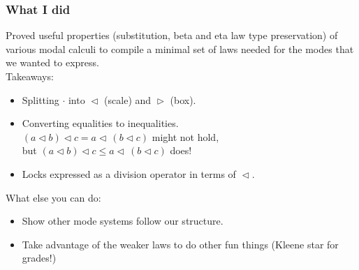 \documentclass[9pt]{beamer}
\DeclareMathOperator{\scale}{\mathbin{\triangleleft}}
\DeclareMathOperator{\boxop}{\mathbin{\triangleright}}
\begin{document}
\begin{frame}
\vspace{0.7em}
\frametitle{What I did}
Proved useful properties (substitution, beta and eta law type preservation) of various modal calculi to compile a minimal set of laws needed for the modes that we wanted to express. \\

Takeaways:
\begin{itemize}
  \item Splitting $\cdot$ into $\scale$ (scale) and $\boxop$ (box).
  \item Converting equalities to inequalities. \\
  $(a \scale b) \scale c = a \scale \, (b \scale c)$ might not hold, 
  \\
  but $(a \scale b) \scale c \le a \scale \, (b \scale c)$ does!
  \item Locks expressed as a division operator in terms of $\scale$.
\end{itemize}

What else you can do:
\begin{itemize}
  \item Show other mode systems follow our structure.
  \item Take advantage of the weaker laws to do other fun things (Kleene star for grades!)
\end{itemize}

\end{frame}
\end{document}
